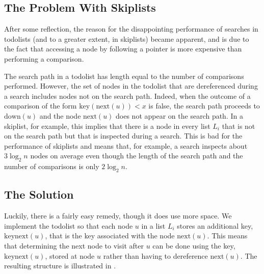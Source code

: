 \documentclass[lotsofwhite]{patmorin}
\begin{document}
\subsection{The Problem With Skiplists}

After some reflection, the reason for the disappointing performance of
searches in todolists (and to a greater extent, in skiplists) became
apparent, and is due to the fact that accessing a node by following a
pointer is more expensive than performing a comparison.

The search path in a todolist has length equal to the number of
comparisons performed.  However, the set of nodes in the todolist
that are dereferenced during a search includes nodes not on the
search path. Indeed, when the outcome of a comparison of the form
$\mathrm{key}(\mathrm{next}(u)) < x$ is false, the search path proceeds
to $\mathrm{down}(u)$ and the node $\mathrm{next}(u)$ does not appear
on the search path.  In a skiplist,
for example, this implies that there is a node in every list $L_i$
that is not on the search path but that is inspected during a search.
This is bad for the performance of skiplists and means that, for example,
a search inspects about $3\log_2 n$ nodes on average even though the length
of the search path and the number of comparisons is only $2\log_2 n$.

\subsection{The Solution}

Luckily, there is a fairly easy remedy, though it does use more space.
We implement the todolist so that each node $u$ in a list $L_i$ stores an
additional key, $\mathrm{keynext}(u)$, that is the key associated with
the node $\mathrm{next}(u)$.  This means that determining the next node
to visit after $u$ can be done using the key, $\mathrm{keynext}(u)$, stored
at node $u$ rather than having to dereference $\mathrm{next}(u)$. The
resulting structure is illustrated in .
\end{document}
